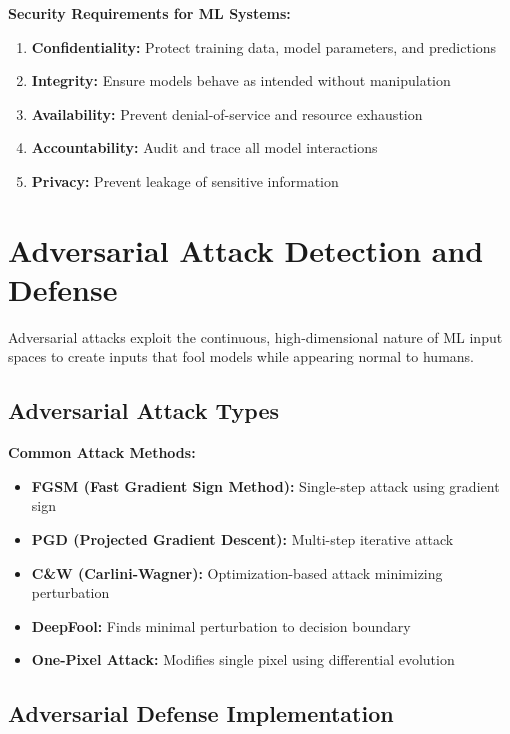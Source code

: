 \textbf{Security Requirements for ML Systems:}

\begin{enumerate}
    \item \textbf{Confidentiality:} Protect training data, model parameters, and predictions
    \item \textbf{Integrity:} Ensure models behave as intended without manipulation
    \item \textbf{Availability:} Prevent denial-of-service and resource exhaustion
    \item \textbf{Accountability:} Audit and trace all model interactions
    \item \textbf{Privacy:} Prevent leakage of sensitive information
\end{enumerate}

\section{Adversarial Attack Detection and Defense}

Adversarial attacks exploit the continuous, high-dimensional nature of ML input spaces to create inputs that fool models while appearing normal to humans.

\subsection{Adversarial Attack Types}

\textbf{Common Attack Methods:}

\begin{itemize}
    \item \textbf{FGSM (Fast Gradient Sign Method):} Single-step attack using gradient sign
    \item \textbf{PGD (Projected Gradient Descent):} Multi-step iterative attack
    \item \textbf{C\&W (Carlini-Wagner):} Optimization-based attack minimizing perturbation
    \item \textbf{DeepFool:} Finds minimal perturbation to decision boundary
    \item \textbf{One-Pixel Attack:} Modifies single pixel using differential evolution
\end{itemize}

\subsection{Adversarial Defense Implementation}

